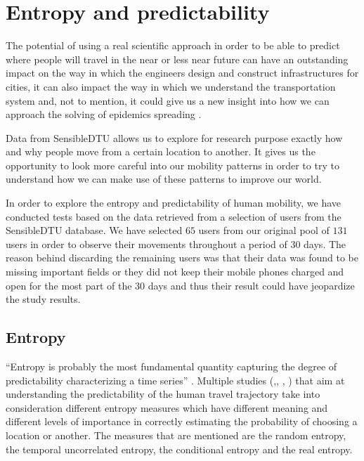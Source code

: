 \chapter{Entropy and predictability}

The potential of using a real scientific approach in order to be able to predict
where people will travel in the near or less near future can have an outstanding
impact on the way in which the engineers design and construct infrastructures
for cities, it can also impact the way in which we understand the transportation
system and, not to mention, it could give us a new insight into how we can
approach the solving of epidemics spreading \cite{Lu13} \cite{Brockmann08}.

Data from SensibleDTU \cite{Stopczynski14m} allows us to explore for research
purpose exactly how and why people move from a certain location to another. It
gives us the opportunity to look more careful into our mobility patterns in
order to try to understand how we can make use of these patterns to improve our
world.

In order to explore the entropy and predictability of human mobility, we have
conducted tests based on the data retrieved from a selection of users from the
SensibleDTU database. We have selected $65$ users from our original pool of
$131$ users in order to observe their movements throughout a period of $30$ days. The
reason behind discarding the remaining users was that their data was found to be
missing important fields or they did not keep their mobile phones charged and
open for the most part of the $30$ days and thus their result could have
jeopardize the study results.

\section{Entropy}

``Entropy is probably the most fundamental quantity capturing the degree of
predictability characterizing a time series'' \cite{Barabasi10}. Multiple
studies (\cite{Sinatra14},\cite{Lu13}, \cite{marin2012exploring},
\cite{Barabasi10}) that aim at understanding the predictability of the human
travel trajectory take into consideration different entropy measures which have
different meaning and different levels of importance in correctly estimating the
probability of choosing a location or another. The measures that are mentioned
are the random entropy, the temporal uncorrelated entropy, the conditional
entropy and the real entropy.


